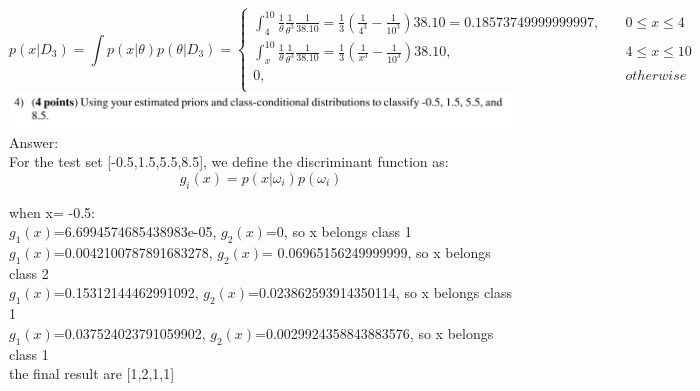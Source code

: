 \documentclass{article}
\begin{document}
\begin{equation*}
p(x|D_3)=\int p(x|\theta)p(\theta|D_3)=\left\{
\begin{aligned}
\int_{4}^{10}\frac{1}{\theta}\frac{1}{\theta^3}\frac{1}{38.10}=\frac{1}{3}(\frac{1}{4^3}-\frac{1}{10^3}){38.10}=0.18573749999999997,&\quad 0\leq x\leq4\\
\int_{x}^{10}\frac{1}{\theta}\frac{1}{\theta^3}\frac{1}{38.10}=\frac{1}{3}(\frac{1}{x^3}-\frac{1}{10^3}){38.10},&\quad 4\leq x\leq 10\\
0,&\quad otherwise
\\
\end{aligned}
\right.
\end{equation*}
\includegraphics[width=1\columnwidth]{problem2_4.png}
Answer: \\

For the test set [-0.5,1.5,5.5,8.5], we define the discriminant function as:\\

\begin{equation*}
g_i(x)=p(x|\omega_i)p(\omega_i)
\end{equation*}

when x= -0.5: \\
$g_1(x)$=6.6994574685438983e-05, $g_2(x)$=0, so x belongs class 1\\
$g_1(x)$=0.0042100787891683278, $g_2(x)$= 0.06965156249999999, so x belongs class 2\\
$g_1(x)$=0.15312144462991092, $g_2(x)$=0.023862593914350114, so x belongs class 1\\
$g_1(x)$=0.037524023791059902, $g_2(x)$=0.0029924358843883576, so x belongs class 1\\

the final result are [1,2,1,1]
\end{document}
